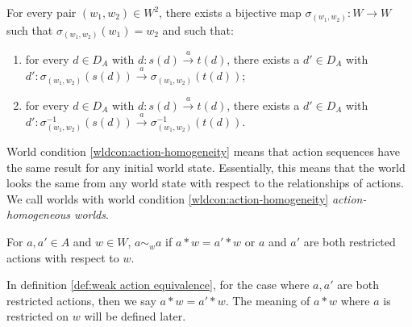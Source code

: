 \begin{world_condition}\label{wldcon:action-homogeneity}
    For every pair $(w_{1}, w_{2}) \in W^{2}$, there exists a bijective map $\sigma_{(w_{1},w_{2})}: W \to W$ such that $\sigma_{(w_{1},w_{2})}(w_{1})=w_{2}$ and such that:
    
    \begin{enumerate}
        \item for every $d \in D_{A}$ with $d: s(d) \xrightarrow{a} t(d)$, there exists a $d' \in D_{A}$ with $d': \sigma_{(w_{1}, w_{2})}(s(d)) \xrightarrow{a} \sigma_{(w_{1}, w_{2})}(t(d))$;
        
        \item for every $d \in D_{A}$ with $d: s(d) \xrightarrow{a} t(d)$, there exists a $d' \in D_{A}$ with $d': \sigma^{-1}_{(w_{1}, w_{2})}(s(d)) \xrightarrow{a} \sigma^{-1}_{(w_{1}, w_{2})}(t(d))$.
    \end{enumerate}
\end{world_condition}

World condition \ref{wldcon:action-homogeneity} means that action sequences have the same result for any initial world state.
Essentially, this means that the world looks the same from any world state with respect to the relationships of actions.
We call worlds with world condition \ref{wldcon:action-homogeneity} \textit{action-homogeneous worlds}.

\begin{definition}\label{def:weak action equivalence}
    For $a,a' \in A$ and $w \in W$, $a \sim_{w} a$ if $a * w = a' * w$ or $a$ and $a'$ are both restricted actions with respect to $w$.
\end{definition}

\begin{remark}
    In definition \ref{def:weak action equivalence}, for the case where $a, a'$ are both restricted actions, then we say $a * w = a' * w$.
    The meaning of $a * w$ where $a$ is restricted on $w$ will be defined later.
\end{remark}

